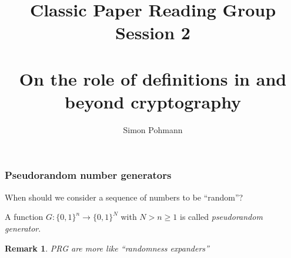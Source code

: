 \documentclass{beamer}
\title{Classic Paper Reading Group Session 2\\~\\On the role of definitions in and beyond cryptography \cite{role_of_definitions}}
\author{Simon Pohmann}
\newtheorem{remark}{Remark}
\begin{document}
\begin{frame}
    \maketitle
\end{frame}

\begin{frame}
    \frametitle{Pseudorandom number generators}
    \begin{center}
        When should we consider a sequence of numbers to be ``random''?
    \end{center}
    \pause
    \begin{definition}
        A function $G: \{ 0, 1 \}^n \to \{ 0, 1 \}^N$ with $N > n \geq 1$ is called \emph{pseudorandom generator}.
    \end{definition}
    \pause
    \begin{remark}
        PRG are more like ``randomness expanders''
    \end{remark}
\end{frame}
\end{document}
